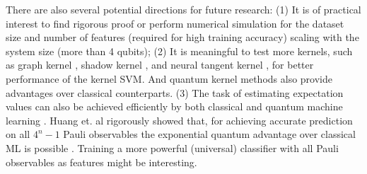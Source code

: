 \documentclass[
aps,
pra,
twocolumn,
floatfix,
]{revtex4-2}
\theoremstyle{plain}
\theoremstyle{definition}
\newcommand{\ob}{O}
\newcommand{\pob}{O}
\newcommand{\dm}{\rho}
\begin{document}
There are also several potential directions for future research:
(1) It is of practical interest to find rigorous proof or perform numerical simulation for the dataset size and number of features (required for high training accuracy) scaling with the system size (more than 4 qubits);
(2) It is meaningful to test more kernels, such as graph kernel \cite{vishwanathanGraphKernels2010}, shadow kernel \cite{huangProvablyEfficientMachine2022}, and neural tangent kernel \cite{jacotNeuralTangentKernel2020}, for better performance of the kernel SVM.
And quantum kernel methods \cite{schuldQuantumMachineLearning2019,schuldSupervisedQuantumMachine2021,liuRigorousRobustQuantum2021} also provide advantages over classical counterparts.
(3) 
The task of estimating expectation values can also be achieved efficiently by both classical \cite{gaoEfficientRepresentationQuantum2017,torlaiManybodyQuantumState2018,zhuFlexibleLearningQuantum2022} and quantum machine learning \cite{huangPowerDataQuantum2021,huangProvablyEfficientMachine2022}.
Huang et. al rigorously showed that, 
for achieving accurate prediction on all $4^n-1$ Pauli observables 
the exponential quantum advantage over classical ML is possible
\cite{huangInformationtheoreticBoundsQuantum2021}.
Training a more powerful (universal) classifier with all Pauli observables as features might be interesting.
\end{document}
